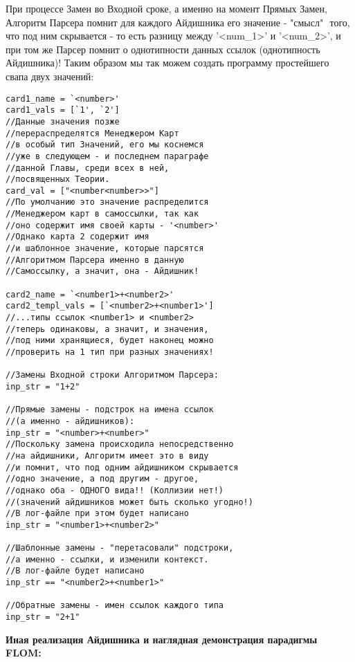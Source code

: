 \documentclass{book}
\begin{document}
При процессе Замен во Входной сроке, а именно на момент Прямых Замен, Алгоритм Парсера помнит для каждого Айдишника его значение - "смысл" $ $ того, что под ним скрывается - то есть разницу между '<num\_1>' и '<num\_2>', и при том же Парсер помнит о однотипности данных ссылок (однотипность Айдишника)! Таким образом мы так можем создать программу простейшего свапа двух значений:

\begin{verbatim}
card1_name = `<number>'
card1_vals = [`1', `2']
//Данные значения позже
//перераспределятся Менеджером Карт
//в особый тип Значений, его мы коснемся
//уже в следующем - и последнем параграфе
//данной Главы, среди всех в ней,
//посвященных Теории.
card_val = ["<number<number>>"]
//По умолчанию это значение распределится
//Менеджером карт в самоссылки, так как
//оно содержит имя своей карты - '<number>'
//Однако карта 2 содержит имя 
//и шаблонное значение, которые парсятся
//Алгоритмом Парсера именно в данную
//Самоссылку, а значит, она - Айдишник!

card2_name = `<number1>+<number2>'
card2_templ_vals = [`<number2>+<number1>']
//...типы ссылок <number1> и <number2>
//теперь одинаковы, а значит, и значения,
//под ними хранящиеся, будет наконец можно
//проверить на 1 тип при разных значениях!

//Замены Входной строки Алгоритмом Парсера:
inp_str = "1+2"

//Прямые замены - подстрок на имена ссылок
//(а именно - айдишников):
inp_str = "<number>+<number>"
//Поскольку замена происходила непосредственно
//на айдишники, Алгоритм имеет это в виду
//и помнит, что под одним айдишником скрывается
//одно значение, а под другим - другое,
//однако оба - ОДНОГО вида!! (Коллизии нет!)
//(значений айдишников может быть сколько угодно!)
//В лог-файле при этом будет написано
inp_str = "<number1>+<number2>"

//Шаблонные замены - "перетасовали" подстроки, 
//а именно - ссылки, и изменили контекст.
//В лог-файле будет написано
inp_str == "<number2>+<number1>"

//Обратные замены - имен ссылок каждого типа
inp_str = "2+1"
\end{verbatim}

\textbf{Иная реализация Айдишника и наглядная демонстрация парадигмы FLOM:}
\end{document}
